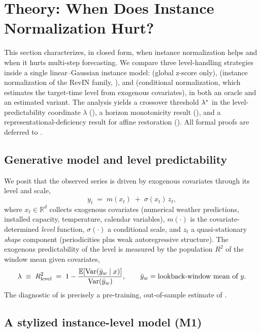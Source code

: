 \section{Theory: When Does Instance Normalization Hurt?}\label{sec:theory}

This section characterizes, in closed form, when instance normalization helps and when it hurts multi-step forecasting. We compare three level-handling strategies inside a single linear--Gaussian instance model: \rawm{} (global z-score only), \inm{} (instance normalization of the RevIN family, \citealp{kim2022revin}), and \cnm{} (conditional normalization, which estimates the target-time level from exogenous covariates), in both an oracle and an estimated variant. The analysis yields a crossover threshold $\lambda^{*}$ in the level-predictability coordinate $\lambda$ (), a horizon monotonicity result (), and a representational-deficiency result for affine restoration (). All formal proofs are deferred to .

\subsection{Generative model and level predictability}

We posit that the observed series is driven by exogenous covariates through its level and scale,
\begin{equation}\label{eq:model}
  y_t \;=\; m(x_t) \;+\; \sigma(x_t)\, z_t ,
\end{equation}
where $x_t \in \mathbb{R}^d$ collects exogenous covariates (numerical weather predictions, installed capacity, temperature, calendar variables), $m(\cdot)$ is the covariate-determined \emph{level} function, $\sigma(\cdot)$ a conditional scale, and $z_t$ a quasi-stationary \emph{shape} component (periodicities plus weak autoregressive structure). The exogenous predictability of the level is measured by the population $R^2$ of the window mean given covariates,
\begin{equation}\label{eq:lambda}
  \lambda \;\equiv\; R^2_{\mathrm{level}}
  \;=\; 1 - \frac{\mathbb{E}\!\left[\mathrm{Var}\!\left(\bar y_w \mid x\right)\right]}{\mathrm{Var}\!\left(\bar y_w\right)},
  \qquad \bar y_w = \text{lookback-window mean of } y .
\end{equation}
The diagnostic of  is precisely a pre-training, out-of-sample estimate of .

\subsection{A stylized instance-level model (M1)}

